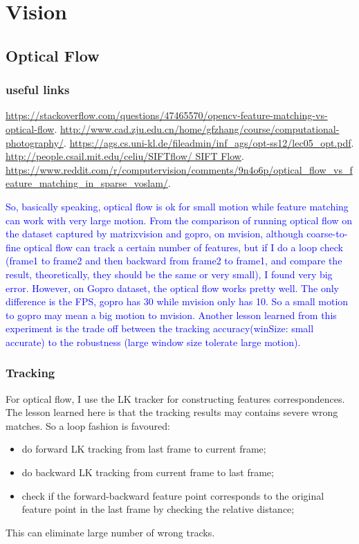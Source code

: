 
\chapter{Vision}
\section{Optical Flow}
\subsection{useful links}
\url{https://stackoverflow.com/questions/47465570/opencv-feature-matching-vs-optical-flow}.
\url{http://www.cad.zju.edu.cn/home/gfzhang/course/computational-photography/}.
\url{https://ags.cs.uni-kl.de/fileadmin/inf_ags/opt-ss12/lec05_opt.pdf}.
\url{http://people.csail.mit.edu/celiu/SIFTflow/ SIFT Flow}.
\url{https://www.reddit.com/r/computervision/comments/9n4o6p/optical_flow_vs_feature_matching_in_sparse_voslam/}.

\textcolor{blue}{So, basically speaking, optical flow is ok for small motion while feature matching can work with very large motion. From the comparison of running optical flow on the dataset captured by matrixvision and gopro, on mvision, although coarse-to-fine optical flow can track a certain number of features, but if I do a loop check (frame1 to frame2 and then backward from frame2 to frame1, and compare the result, theoretically, they should be the same or very small), I found very big error. However, on Gopro dataset, the optical flow works pretty well. The only difference is the FPS, gopro has 30 while mvision only has 10. So a small motion to gopro may mean a big motion to mvision. Another lesson learned from this experiment is the trade off between the tracking accuracy(winSize: small accurate) to the robustness (large window size tolerate large motion).}

\subsection{Tracking}
For optical flow, I use the LK tracker for constructing features correspondences. The lesson learned here is that the tracking results may contains severe wrong matches. So a loop fashion is favoured: 
\begin{itemize}
	\item do forward LK tracking from last frame to current frame;
	\item do backward LK tracking from current frame to last frame;
	\item check if the forward-backward feature point corresponds to the original feature point in the last frame by checking the relative distance; 
\end{itemize}
This can eliminate large number of wrong tracks.

